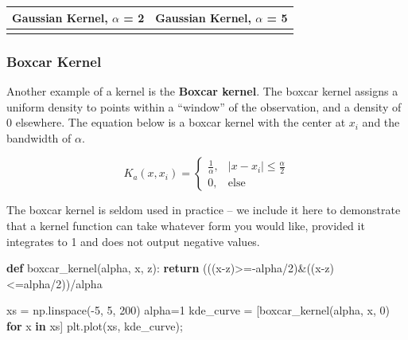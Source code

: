 \documentclass[
  letterpaper,
  DIV=11,
  numbers=noendperiod]{scrreprt}
\newenvironment{Shaded}{\begin{snugshade}}{\end{snugshade}}
\newcommand{\ControlFlowTok}[1]{\textcolor[rgb]{0.00,0.23,0.31}{\textbf{#1}}}
\newcommand{\DecValTok}[1]{\textcolor[rgb]{0.68,0.00,0.00}{#1}}
\newcommand{\KeywordTok}[1]{\textcolor[rgb]{0.00,0.23,0.31}{\textbf{#1}}}
\newcommand{\NormalTok}[1]{\textcolor[rgb]{0.00,0.23,0.31}{#1}}
\newcommand{\OperatorTok}[1]{\textcolor[rgb]{0.37,0.37,0.37}{#1}}
\begin{document}
\begin{longtable}[]{@{}
  >{\raggedright\arraybackslash}p{}
  >{\raggedright\arraybackslash}p{}@{}}
\toprule\noalign{}
\begin{minipage}[b]{\linewidth}\raggedright
Gaussian Kernel, \(\alpha\) = 2
\end{minipage} & \begin{minipage}[b]{\linewidth}\raggedright
Gaussian Kernel, \(\alpha\) = 5
\end{minipage} \\
\midrule\noalign{}
\endhead
\bottomrule\noalign{}
\endlastfoot
& \\
\end{longtable}

\subsubsection{Boxcar Kernel}\label{boxcar-kernel}

Another example of a kernel is the \textbf{Boxcar kernel}. The boxcar
kernel assigns a uniform density to points within a ``window'' of the
observation, and a density of 0 elsewhere. The equation below is a
boxcar kernel with the center at \(x_i\) and the bandwidth of
\(\alpha\).

\[K_a(x, x_i) = \begin{cases}
        \frac{1}{\alpha}, & |x - x_i| \le \frac{\alpha}{2}\\
        0, & \text{else }
    \end{cases}\]

The boxcar kernel is seldom used in practice -- we include it here to
demonstrate that a kernel function can take whatever form you would
like, provided it integrates to 1 and does not output negative values.

\begin{Shaded}
\begin{Highlighting}[]
\KeywordTok{def}\NormalTok{ boxcar\_kernel(alpha, x, z):}
    \ControlFlowTok{return}\NormalTok{ (((x}\OperatorTok{{-}}\NormalTok{z)}\OperatorTok{\textgreater{}={-}}\NormalTok{alpha}\OperatorTok{/}\DecValTok{2}\NormalTok{)}\OperatorTok{\&}\NormalTok{((x}\OperatorTok{{-}}\NormalTok{z)}\OperatorTok{\textless{}=}\NormalTok{alpha}\OperatorTok{/}\DecValTok{2}\NormalTok{))}\OperatorTok{/}\NormalTok{alpha}

\NormalTok{xs }\OperatorTok{=}\NormalTok{ np.linspace(}\OperatorTok{{-}}\DecValTok{5}\NormalTok{, }\DecValTok{5}\NormalTok{, }\DecValTok{200}\NormalTok{)}
\NormalTok{alpha}\OperatorTok{=}\DecValTok{1}
\NormalTok{kde\_curve }\OperatorTok{=}\NormalTok{ [boxcar\_kernel(alpha, x, }\DecValTok{0}\NormalTok{) }\ControlFlowTok{for}\NormalTok{ x }\KeywordTok{in}\NormalTok{ xs]}
\NormalTok{plt.plot(xs, kde\_curve)}\OperatorTok{;}
\end{Highlighting}
\end{Shaded}
\end{document}
